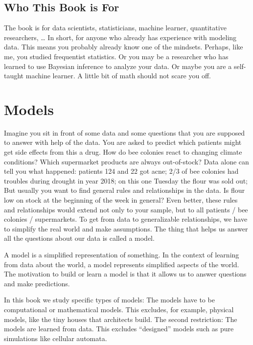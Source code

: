 \documentclass[
  10pt,
]{scrbook}
\begin{document}
\hypertarget{who-this-book-is-for}{%
\section{Who This Book is For}\label{who-this-book-is-for}}

The book is for data scientists, statisticians, machine learner, quantitative researchers, \ldots{}
In short, for anyone who already has experience with modeling data.
This means you probably already know one of the mindsets.
Perhaps, like me, you studied frequentist statistics.
Or you may be a researcher who has learned to use Bayesian inference to analyze your data.
Or maybe you are a self-taught machine learner.
A little bit of math should not scare you off.

\mainmatter

\hypertarget{models}{%
\chapter{Models}\label{models}}

Imagine you sit in front of some data and some questions that you are supposed to answer with help of the data.
You are asked to predict which patients might get side effects from this a drug.
How do bee colonies react to changing climate conditions?
Which supermarket products are always out-of-stock?
Data alone can tell you what happened: patients 124 and 22 got acne; 2/3 of bee colonies had troubles during drought in year 2018; on this one Tuesday the flour was sold out;
But usually you want to find general rules and relationships in the data.
Is flour low on stock at the beginning of the week in general?
Even better, these rules and relationships would extend not only to your sample, but to all patients / bee colonies / supermarkets.
To get from data to generalizable relationships, we have to simplify the real world and make assumptions.
The thing that helps us answer all the questions about our data is called a model.

A model is a simplified representation of something.
In the context of learning from data about the world, a model represents simplified aspects of the world.
The motivation to build or learn a model is that it allows us to answer questions and make predictions.

In this book we study specific types of models:
The models have to be computational or mathematical models.
This excludes, for example, physical models, like the tiny houses that architects build.
The second restriction: The models are learned from data.
This excludes ``designed'' models such as pure simulations like cellular automata.
\end{document}
